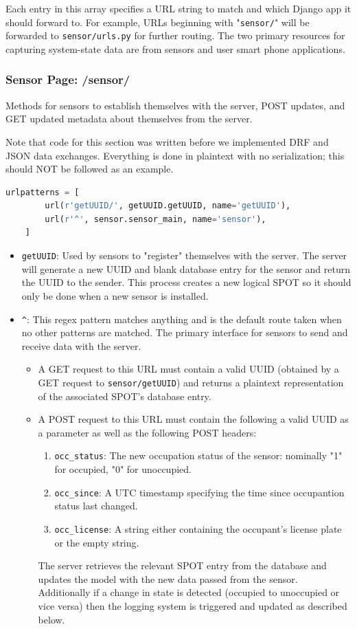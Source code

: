 Each entry in this array specifies a URL string to match and which Django app it should forward to.  For example, URLs beginning with "\verb|sensor/|" will be forwarded to \verb|sensor/urls.py| for further routing.
The two primary resources for capturing system-state data are from sensors and user smart phone applications.

\subsubsection{Sensor Page: /sensor/}
Methods for sensors to establish themselves with the server, POST updates, and GET updated metadata about themselves from the server.

Note that code for this section was written before we implemented DRF and JSON data exchanges.
Everything is done in plaintext with no serialization; this should NOT be followed as an example.
\begin{lstlisting}[language=Python]
    urlpatterns = [
        url(r'getUUID/', getUUID.getUUID, name='getUUID'),
        url(r'^', sensor.sensor_main, name='sensor'),
    ]
\end{lstlisting}

\begin{itemize}
  \item \verb|getUUID|: Used by sensors to "register" themselves with the server.
  The server will generate a new UUID and blank database entry for the sensor and return the UUID to the sender.
  This process creates a new logical SPOT so it should only be done when a new sensor is installed.
  \item \verb|^|: This regex pattern matches anything and is the default route taken when no other patterns are matched.
  The primary interface for sensors to send and receive data with the server.
  \begin{itemize}
    \item A GET request to this URL must contain a valid UUID (obtained by a GET request to \verb|sensor/getUUID|) and returns a plaintext representation of the associated SPOT's database entry.
    \item A POST request to this URL must contain the following a valid UUID as a parameter as well as the following POST headers:
    \begin{enumerate}
        \item \verb|occ_status|: The new occupation status of the sensor: nominally "1" for occupied, "0" for unoccupied.
        \item \verb|occ_since|: A UTC timestamp specifying the time since occupantion status last changed.
        \item \verb|occ_license|: A string either containing the occupant's license plate or the empty string.
    \end{enumerate}
    The server retrieves the relevant SPOT entry from the database and updates the model with the new data passed from the sensor.
    Additionally if a change in state is detected (occupied to unoccupied or vice versa) then the logging system is triggered and updated as described below.
  \end{itemize}
\end{itemize}

